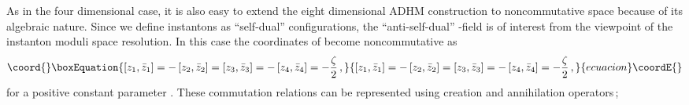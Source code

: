 \documentclass[a4paper,12pt]{article}
\begin{document}
As in the four dimensional case, 
it is also easy to extend the eight dimensional ADHM construction 
to noncommutative space because of its algebraic nature.
Since we define instantons as ``self-dual'' configurations, 
the ``anti-self-dual'' \coordHE{}-field is of interest from the viewpoint of 
the instanton moduli space resolution.
In this case the coordinates of \coordHE{} become noncommutative as
\begin{equation}\coord{}\boxEquation{
\left[ z_1,\bar{z}_1\right]=-\left[ z_2,\bar{z}_2\right]=
\left[ z_3,\bar{z}_3\right]=-\left[ z_4,\bar{z}_4\right]=-\frac{\zeta}{2}\,,
}{
\left[ z_1,\bar{z}_1\right]=-\left[ z_2,\bar{z}_2\right]=
\left[ z_3,\bar{z}_3\right]=-\left[ z_4,\bar{z}_4\right]=-\frac{\zeta}{2}\,,
}{ecuacion}\coordE{}\end{equation}
for a positive constant parameter \myHighlight{$\zeta$}\coordHE{}.
These commutation relations can be represented using creation and annihilation 
operators\,;
\end{document}
